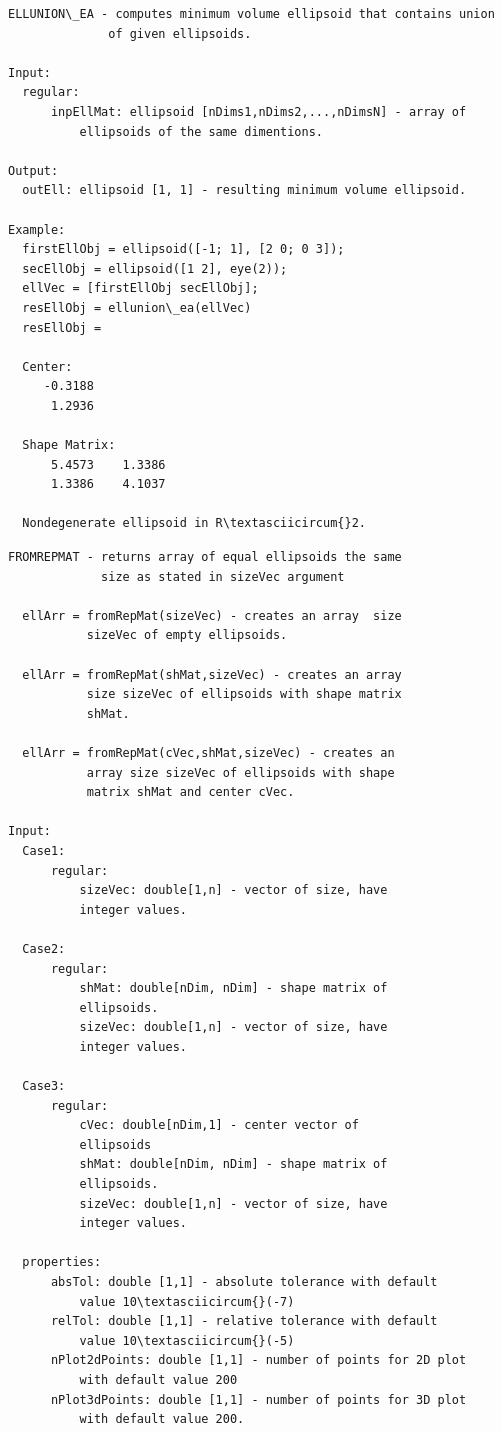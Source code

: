 \documentclass[letterpaper,10pt,english]{sphinxmanual}
\begin{document}
\begin{Verbatim}[commandchars=\\\{\}]
ELLUNION\_EA - computes minimum volume ellipsoid that contains union
              of given ellipsoids.

Input:
  regular:
      inpEllMat: ellipsoid [nDims1,nDims2,...,nDimsN] - array of
          ellipsoids of the same dimentions.

Output:
  outEll: ellipsoid [1, 1] - resulting minimum volume ellipsoid.

Example:
  firstEllObj = ellipsoid([-1; 1], [2 0; 0 3]);
  secEllObj = ellipsoid([1 2], eye(2));
  ellVec = [firstEllObj secEllObj];
  resEllObj = ellunion\_ea(ellVec)
  resEllObj =

  Center:
     -0.3188
      1.2936

  Shape Matrix:
      5.4573    1.3386
      1.3386    4.1037

  Nondegenerate ellipsoid in R\textasciicircum{}2.
\end{Verbatim}

\begin{Verbatim}[commandchars=\\\{\}]
FROMREPMAT - returns array of equal ellipsoids the same
             size as stated in sizeVec argument

  ellArr = fromRepMat(sizeVec) - creates an array  size
           sizeVec of empty ellipsoids.

  ellArr = fromRepMat(shMat,sizeVec) - creates an array
           size sizeVec of ellipsoids with shape matrix
           shMat.

  ellArr = fromRepMat(cVec,shMat,sizeVec) - creates an
           array size sizeVec of ellipsoids with shape
           matrix shMat and center cVec.

Input:
  Case1:
      regular:
          sizeVec: double[1,n] - vector of size, have
          integer values.

  Case2:
      regular:
          shMat: double[nDim, nDim] - shape matrix of
          ellipsoids.
          sizeVec: double[1,n] - vector of size, have
          integer values.

  Case3:
      regular:
          cVec: double[nDim,1] - center vector of
          ellipsoids
          shMat: double[nDim, nDim] - shape matrix of
          ellipsoids.
          sizeVec: double[1,n] - vector of size, have
          integer values.

  properties:
      absTol: double [1,1] - absolute tolerance with default
          value 10\textasciicircum{}(-7)
      relTol: double [1,1] - relative tolerance with default
          value 10\textasciicircum{}(-5)
      nPlot2dPoints: double [1,1] - number of points for 2D plot
          with default value 200
      nPlot3dPoints: double [1,1] - number of points for 3D plot
          with default value 200.
\end{Verbatim}
\end{document}
